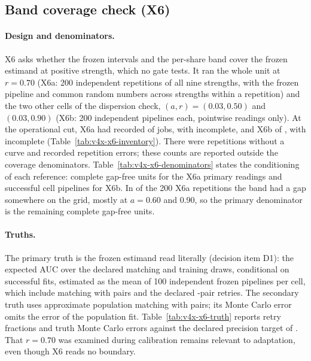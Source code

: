 \subsection{Band coverage check (X6)}\label{sec:x6}

\paragraph{Design and denominators.}
X6 asks whether the frozen intervals and the per-share band cover the frozen estimand at positive strength, which no gate tests. It ran the whole unit at $r=0.70$ (X6a: 200 independent repetitions of all nine strengths, with the frozen pipeline and common random numbers across strengths within a repetition) and the two other cells of the dispersion check, $(a,r)=(0.03,0.50)$ and $(0.03,0.90)$ (X6b: 200 independent pipelines each, pointwise readings only). At the operational cut, X6a had recorded  of  jobs, with  incomplete, and X6b  of , with  incomplete (Table~\ref{tab:v4x-x6-inventory}). There were  repetitions without a curve and  recorded repetition errors; these counts are reported outside the coverage denominators. Table~\ref{tab:v4x-x6-denominators} states the conditioning of each reference: complete gap-free units for the X6a primary readings and successful cell pipelines for X6b. In  of the 200 X6a repetitions the band had a gap somewhere on the grid, mostly at $a=0.60$ and 0.90, so the primary denominator is the remaining complete gap-free units.

\paragraph{Truths.}
The primary truth is the frozen estimand read literally (decision item D1): the expected AUC over the declared matching and training draws, conditional on successful fits, estimated as the mean of 100 independent frozen pipelines per cell, which include matching with  pairs and the declared -pair retries. The secondary truth uses approximate population matching with  pairs; its Monte Carlo error omits the error of the population fit. Table~\ref{tab:v4x-x6-truth} reports retry fractions and truth Monte Carlo errors against the declared precision target of . That $r=0.70$ was examined during calibration remains relevant to adaptation, even though X6 reads no boundary.

